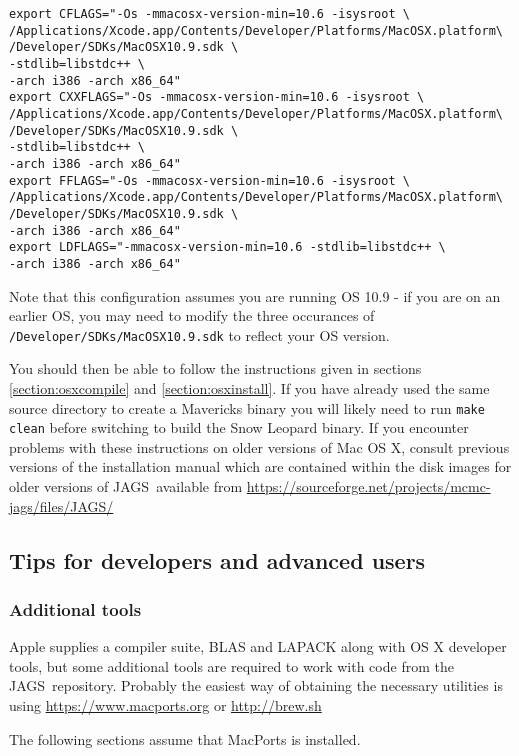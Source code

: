\documentclass[11pt, a4paper, titlepage]{article}
\newcommand{\JAGS}{\textsf{JAGS}}
\begin{document}
\begin{verbatim}
export CFLAGS="-Os -mmacosx-version-min=10.6 -isysroot \
/Applications/Xcode.app/Contents/Developer/Platforms/MacOSX.platform\
/Developer/SDKs/MacOSX10.9.sdk \
-stdlib=libstdc++ \
-arch i386 -arch x86_64"
export CXXFLAGS="-Os -mmacosx-version-min=10.6 -isysroot \
/Applications/Xcode.app/Contents/Developer/Platforms/MacOSX.platform\
/Developer/SDKs/MacOSX10.9.sdk \
-stdlib=libstdc++ \
-arch i386 -arch x86_64"
export FFLAGS="-Os -mmacosx-version-min=10.6 -isysroot \
/Applications/Xcode.app/Contents/Developer/Platforms/MacOSX.platform\
/Developer/SDKs/MacOSX10.9.sdk \
-arch i386 -arch x86_64"
export LDFLAGS="-mmacosx-version-min=10.6 -stdlib=libstdc++ \
-arch i386 -arch x86_64"
\end{verbatim}

Note that this configuration assumes you are running OS 10.9 - if you 
are on an earlier OS, you may need to modify the three occurances of 
\texttt{/Developer/SDKs/MacOSX10.9.sdk} to reflect your OS version.

You should then be able to follow the instructions given in sections \ref{section:osxcompile}
and \ref{section:osxinstall}.  If you have already used the same source directory to create
a Mavericks binary you will likely need to run \texttt{make clean} before switching
to build the Snow Leopard binary. If you encounter problems with these instructions on 
older versions of Mac OS X, consult previous versions of the installation manual 
which are contained within the disk images for older versions of \JAGS\ available from
\url{https://sourceforge.net/projects/mcmc-jags/files/JAGS/}


\subsection{Tips for developers and advanced users}

\subsubsection{Additional tools}
\label{section:osxtools}

Apple supplies a compiler suite, BLAS and LAPACK along with OS X developer tools, but some
additional tools are required to work with code from the \JAGS\ repository.  Probably 
the easiest way of obtaining the necessary utilities is using
\url{https://www.macports.org} or \url{http://brew.sh} 

The following sections assume that MacPorts is installed.
\end{document}
